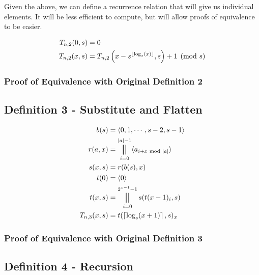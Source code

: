 \documentclass[conference]{IEEEtran}
\begin{document}
Given the above, we can define a recurrence relation that will give us individual elements. It will be less efficient to compute, but will allow proofs of equivalence to be easier.

\begin{equation}
    \begin{aligned}
T_{n,2}(0, s) &= 0 \\
T_{n,2}(x, s) &= T_{n,2}\left(x - s^{\left\lfloor \log_s(x) \right\rfloor}, s\right) + 1 \pmod{s}
    \end{aligned}
\end{equation}

\subsubsection{Proof of Equivalence with Original Definition 2}

\subsection{Definition 3 - Substitute and Flatten}


\begin{equation}
    \label{eq:pnd03}
    \begin{aligned}
      b(s) &= \tuple{0, 1, \cdots, s - 2, s - 1} \\
   r(a, x) &= \bigparallel_{i=0}^{|a| - 1} \tuple{a_{i + x \text{ mod }|a|}} \\
   s(x, s) &= r(b(s), x) \\
      t(0) &= \tuple{0} \\
      t(x, s) &= \bigparallel_{i=0}^{2^{x-1}-1} s(t(x-1)_i, s)  \\
T_{n,3}(x, s) &= t(\ceil{\log_s(x + 1)}, s)_x
    \end{aligned}
\end{equation}

\subsubsection{Proof of Equivalence with Original Definition 3}

\subsection{Definition 4 - Recursion}
\end{document}

